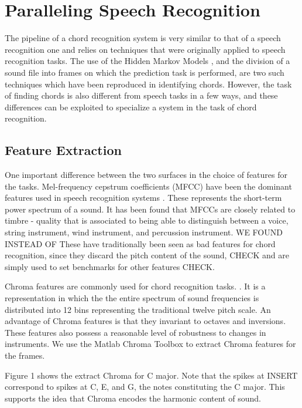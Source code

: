\documentclass{article}
\begin{document}
\section{Paralleling Speech Recognition}

The pipeline of a chord recognition system is very similar to that of a speech recognition one and relies on techniques that were originally applied to speech recognition tasks. The use of the Hidden Markov Models \cite{young} , and the division of a sound file into frames on which the prediction task is performed, are two such techniques which have been reproduced in identifying chords. However, the task of finding chords is also different from speech tasks in a few ways, and these differences can be exploited to specialize a system in the task of chord recognition.

\subsection{Feature Extraction}

One important difference between the two surfaces in the choice of features for the tasks. Mel-frequency cepstrum coefficients (MFCC) have been the dominant features used in speech recognition systems \cite{young}. These represents the short-term power spectrum of a sound. It has been found that MFCCs are closely related to timbre - quality that is associated to being able to distinguish between a voice, string instrument, wind instrument, and percussion instrument. WE FOUND INSTEAD OF These have traditionally been seen as bad features for chord recognition, since they discard the pitch content of the sound, CHECK and are simply used to set benchmarks for other features CHECK.

Chroma features are commonly used for chord recognition tasks. \cite{fujishima}. It is a representation in which the the entire spectrum of sound frequencies is distributed into 12 bins representing the traditional twelve pitch scale. An advantage of Chroma features is that they invariant to octaves and inversions. These features also possess a reasonable level of robustness to changes in instruments. We use the Matlab Chroma Toolbox to extract Chroma features for the frames.

Figure 1 shows the extract Chroma for C major. Note that the spikes at INSERT correspond to spikes at C, E, and G, the notes constituting the C major. This supports the idea that Chroma encodes the harmonic content of sound.
\end{document}
